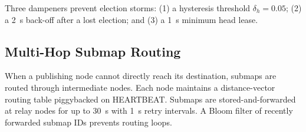 Three dampeners prevent election storms: (1) a hysteresis threshold
$\delta_h=0.05$; (2) a 2~s back-off after a lost election; and (3) a 1~s
minimum head lease.

\subsection{Multi-Hop Submap Routing}

When a publishing node cannot directly reach its destination, submaps are
routed through intermediate nodes. Each node maintains a distance-vector
routing table piggybacked on HEARTBEAT. Submaps are stored-and-forwarded at
relay nodes for up to 30~s with 1~s retry intervals. A Bloom filter of
recently forwarded submap IDs prevents routing loops.
